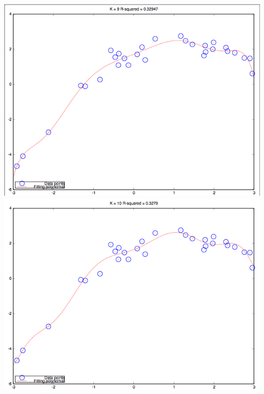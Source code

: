 \documentclass[10pt]{article}
\begin{document}
\begin{itemize}
  \includegraphics[width=\textwidth,height=\textheight,keepaspectratio]{K9}
  \includegraphics[width=\textwidth,height=\textheight,keepaspectratio]{K10}
\end{itemize}
\end{document}
